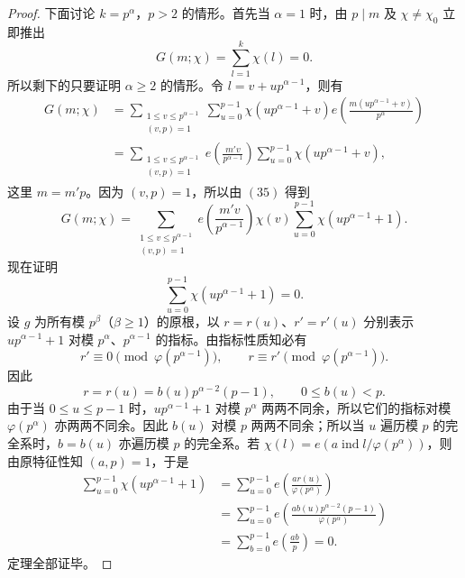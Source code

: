 \begin{proof}
	下面讨论 $k=p^\alpha$，$p>2$ 的情形。首先当 $\alpha=1$ 时，由 $p\mid m$ 及 $\chi\neq\chi_0$ 立即推出
	\[
		G(m;\chi)=\sum_{l=1}^{k}\chi(l)=0.
	\]
	所以剩下的只要证明 $\alpha\geq2$ 的情形。令 $l=v+up^{\alpha-1}$，则有
	\begin{equation}
	\begin{aligned}
		G(m;\chi)
		&=
		\sum_{\substack{1\leq v\leq p^{\alpha-1}\\ (v,p)=1}}
		\sum_{u=0}^{p-1}
		\chi(up^{\alpha-1}+v)
		e\left(\frac{m(up^{\alpha-1}+v)}{p^\alpha}\right)  \\
		&=
		\sum_{\substack{1\leq v\leq p^{\alpha-1}\\ (v,p)=1}}
		e\left(\frac{m'v}{p^{\alpha-1}}\right)
		\sum_{u=0}^{p-1}\chi(up^{\alpha-1}+v),
	\end{aligned}
	\tag{35}
	\end{equation}
	这里 $m=m'p$。因为 $(v,p)=1$，所以由 \((35)\) 得到
	\begin{equation}
		G(m;\chi)=
		\sum_{\substack{1\leq v\leq p^{\alpha-1}\\ (v,p)=1}}
		e\left(\frac{m'v}{p^{\alpha-1}}\right)
		\chi(v)
		\sum_{u=0}^{p-1}\chi(up^{\alpha-1}+1).
		\tag{36}
	\end{equation}
	现在证明
	\begin{equation}
		\sum_{u=0}^{p-1}\chi(up^{\alpha-1}+1)=0.
		\tag{37}
	\end{equation}
	设 $g$ 为所有模 $p^\beta$（$\beta\geq1$）的原根，以 $r=r(u)$、$r'=r'(u)$ 分别表示 $up^{\alpha-1}+1$ 对模 $p^\alpha$、$p^{\alpha-1}$ 的指标。由指标性质知必有
	\[
		r'\equiv0\pmod{\varphi(p^{\alpha-1})},\qquad
		r\equiv r'\pmod{\varphi(p^{\alpha-1})}.
	\]
	因此
	\[
		r=r(u)=b(u)p^{\alpha-2}(p-1),\qquad 0\leq b(u)<p.
	\]
	由于当 $0\leq u\leq p-1$ 时，$up^{\alpha-1}+1$ 对模 $p^\alpha$ 两两不同余，所以它们的指标对模 $\varphi(p^\alpha)$ 亦两两不同余。因此 $b(u)$ 对模 $p$ 两两不同余；所以当 $u$ 遍历模 $p$ 的完全系时，$b=b(u)$ 亦遍历模 $p$ 的完全系。若 $\chi(l)=e(a\operatorname{ind}l/\varphi(p^\alpha))$，则由原特征性知 $(a,p)=1$，于是
	\[
	\begin{aligned}
		\sum_{u=0}^{p-1}\chi(up^{\alpha-1}+1)
		&=
		\sum_{u=0}^{p-1}
		e\left(\frac{a r(u)}{\varphi(p^\alpha)}\right)  \\
		&=
		\sum_{u=0}^{p-1}
		e\left(\frac{a b(u)p^{\alpha-2}(p-1)}{\varphi(p^\alpha)}\right)  \\
		&=
		\sum_{b=0}^{p-1}e\left(\frac{ab}{p}\right)=0.
	\end{aligned}
	\]
	定理全部证毕。
\end{proof}

